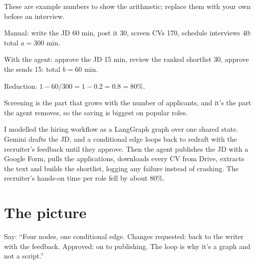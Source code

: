 \begin{example}
These are example numbers to show the arithmetic; replace them with your own before an interview.
\begin{steps}
  \item Manual: write the JD 60 min, post it 30, screen CVs 170, schedule interviews 40: total $a = 300$ min.
  \item With the agent: approve the JD 15 min, review the ranked shortlist 30, approve the sends 15: total $b = 60$ min.
  \item Reduction: $1 - 60/300 = 1 - 0.2 = 0.8 = 80\%$.
\end{steps}
Screening is the part that grows with the number of applicants, and it's the part the agent removes, so the saving is biggest on popular roles.
\end{example}

\begin{sayit}
I modelled the hiring workflow as a LangGraph graph over one shared state. Gemini drafts the JD, and a conditional edge loops back to redraft with the recruiter's feedback until they approve. Then the agent publishes the JD with a Google Form, pulls the applications, downloads every CV from Drive, extracts the text and builds the shortlist, logging any failure instead of crashing. The recruiter's hands-on time per role fell by about 80\%.
\end{sayit}

\section{The picture}

\begin{sayit}
\begin{pic}
\end{pic}
Say: ``Four nodes, one conditional edge. Changes requested: back to the writer with the feedback. Approved: on to publishing. The loop is why it's a graph and not a script.''
\end{sayit}

